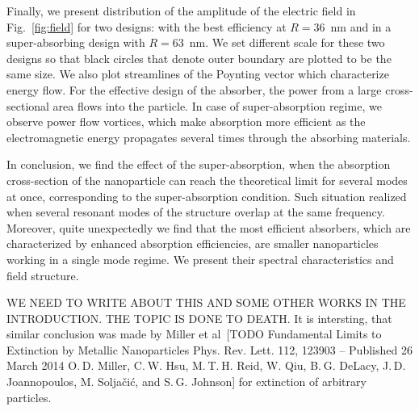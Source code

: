 \documentclass[aps,prl,twocolumn,showpacs,superscriptaddress,groupedaddress]{revtex4-1}
\begin{document}
\begin{figure}
\end{figure}
%
Finally, we present distribution of the amplitude of the electric
field in Fig.~\ref{fig:field} for two designs: with the best
efficiency at $R=36$~nm and in a super-absorbing design with
$R=63$~nm.  We set different scale for these two designs so that black
circles that denote outer boundary are plotted to be the same size.
We also plot streamlines of the Poynting vector which characterize
energy flow. For the effective design of the absorber, the power from
a large cross-sectional area flows into the particle.  In case of
super-absorption regime, we observe power flow vortices, which make
absorption more efficient as the electromagnetic energy propagates
several times through the absorbing materials.


In conclusion, we find the effect of the super-absorption, when the
absorption cross-section of the nanoparticle can reach the theoretical
limit for several modes at once, corresponding to the super-absorption
condition. Such situation realized when several resonant modes of the
structure overlap at the same frequency. Moreover, quite unexpectedly
we find that the most efficient absorbers, which are characterized by
enhanced absorption efficiencies, are smaller nanoparticles working in
a single mode regime. We present their spectral characteristics and
field structure.


WE NEED TO WRITE ABOUT THIS AND SOME OTHER WORKS IN THE
INTRODUCTION. THE TOPIC IS DONE TO DEATH. It is intersting, that
similar conclusion was made by Miller et al~[TODO Fundamental Limits
to Extinction by Metallic Nanoparticles Phys. Rev. Lett. 112, 123903 –
Published 26 March 2014 O. D. Miller, C. W. Hsu, M. T. H. Reid,
W. Qiu, B. G. DeLacy, J. D. Joannopoulos, M. Soljačić, and
S. G. Johnson] for extinction of arbitrary particles.



\end{document}
